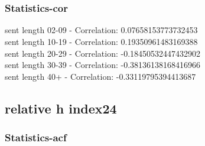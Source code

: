 \documentclass{article}%
\begin{document}
\begin{figure}[ht]%
\centering%
\setlength{\abovecaptionskip}{-35pt}%
%
%
\\%
%
%
\\%
%
\end{figure}

%
\newpage%
\subsubsection{Statistics{-}cor}%
\label{ssubsec:Statistics{-}cor}%
\noindent%
sent length 02-09 - Correlation: 0.07658153773732453\\%
sent length 10-19 - Correlation: 0.19350961483169388\\%
sent length 20-29 - Correlation: -0.18450532447432902\\%
sent length 30-39 - Correlation: -0.38136138168416966\\%
sent length 40+ - Correlation: -0.33119795394413687\\

%
\newpage

%
\subsection{relative h index24}%
\label{subsec:relativehindex24}%
\subsubsection{Statistics{-}acf}%
\label{ssubsec:Statistics{-}acf}%
\end{document}
